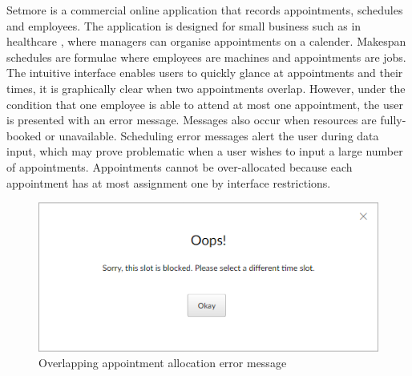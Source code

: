 Setmore is a commercial online application that records appointments, schedules and employees. The application is designed for small business such as in healthcare \cite{setmore}, where managers can organise appointments on a calender. Makespan schedules are formulae where employees are machines and appointments are jobs. The intuitive interface enables users to quickly glance at appointments and their times, it is graphically clear when two appointments overlap. However, under the condition that one employee is able to attend at most one appointment, the user is presented with an error message. Messages also occur when resources are fully-booked or unavailable. Scheduling error messages alert the user during data input, which may prove problematic when a user wishes to input a large number of appointments. Appointments cannot be over-allocated because each appointment has at most assignment one by interface restrictions.

\begin{figure}[H]
	\begin{center}
		\includegraphics[scale=0.6]{figures/setmore_overallocated.png}
	\end{center}
	\caption{Overlapping appointment allocation error message}
\end{figure}


